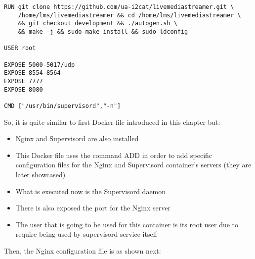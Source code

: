 \begin{verbatim}
RUN git clone https://github.com/ua-i2cat/livemediastreamer.git \
	/home/lms/livemediastreamer && cd /home/lms/livemediastreamer \
	&& git checkout development && ./autogen.sh \
	&& make -j && sudo make install && sudo ldconfig

USER root

EXPOSE 5000-5017/udp
EXPOSE 8554-8564
EXPOSE 7777
EXPOSE 8080

CMD ["/usr/bin/supervisord","-n"] 
\end{verbatim}

So, it is quite similar to first Docker file introduced in this chapter but:

\begin{itemize}
\item Nginx and Supervisord are also installed
\item This Docker file uses the command ADD in order to add specific configuration files for the Nginx and Supervisord container's servers (they are later showcased)
\item What is executed now is the Supervisord daemon
\item There is also exposed the port for the Nginx server
\item The user that is going to be used for this container is its root user due to require being used by supervisord service itself
\end{itemize}

Then, the Nginx configuration file is as shown next:


